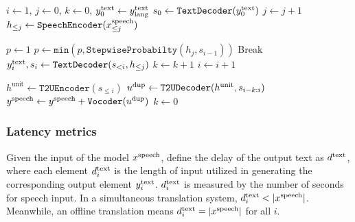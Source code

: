 \begin{algorithm}[!tbh]
\small
  \caption{\seamlessstreaming Inference Algorithm}
  \label{algo:streaming.inference}
  \begin{algorithmic}[1]
    \item[]
    \item[]
    \State $i \gets 1$, $j \gets 0$, $k \gets 0$, $y^{\text{text}}_0 \gets y^{\text{text}}_{\text{lang}}$
    \State $s_0 \gets \texttt{TextDecoder}(y^{\text{text}}_{0})$
        \State $j \gets j + 1$
        \State $h_{\leq j} \gets \texttt{SpeechEncoder}(x^{\text{speech}}_{\leq j})$
 
  
         
            \State $p \gets 1$
            \State $p \gets \texttt{min}(p, \texttt{StepwiseProbabilty}(h_j, s_{i-1}))$
            \EndFor
            \State Break
            \Else
                \State $y^{\text{text}}_i, s_i \gets \texttt{TextDecoder}(s_{<i}, h_{\leq j})$
                \State $k \gets k + 1$
                \State $i \gets i + 1$
            \EndIf
            \EndWhile
            \item[]
         
            \State $h^{\text{unit}} \gets \texttt{T2UEncoder}(s_{\leq i})$
            \State $u^\text{dup} \gets \texttt{T2UDecoder}(h^{\text{unit}}, s_{i-k:i})$
            \State $y^{\text{speech}} \gets y^{\text{speech}} + \texttt{Vocoder}(u^\text{dup})$
            \State $k \gets 0$
             \EndIf
        \EndIf
    \EndWhile
  \end{algorithmic}
\end{algorithm}

\subsubsection{Latency metrics}
\label{sec:streaming.latency}
Given the input of the model $x^{\text{speech}}$,
define the delay of the output text as $d^{\text{text}}$,
where each element $d^{\text{text}}_i$ is the length of input utilized in generating the corresponding output element $y^{\text{text}}_i$.
$d^{\text{text}}_i$ is measured by the number of seconds for speech input.
In a simultaneous translation system, $d^{\text{text}}_i < |x^{\text{speech}}|$.
Meanwhile, an offline translation means $\textbf{}d^{\text{text}}_i = |x^{\text{speech}}|$ for all $i$.

